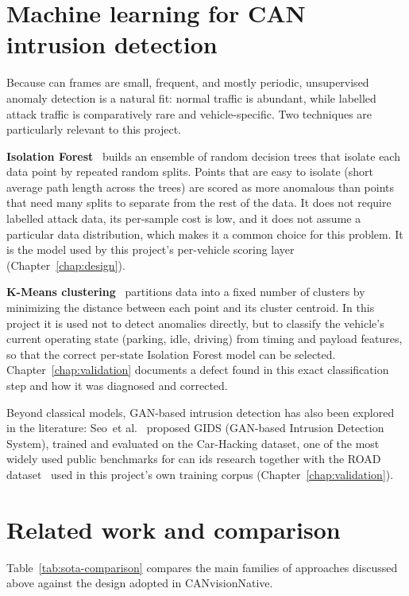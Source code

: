 \section{Machine learning for CAN intrusion detection}

Because \gls{can} frames are small, frequent, and mostly periodic, unsupervised anomaly detection is a natural fit: normal traffic is abundant, while labelled attack traffic is comparatively rare and vehicle-specific. Two techniques are particularly relevant to this project.

\textbf{Isolation Forest}~\cite{liu2008isolation} builds an ensemble of random decision trees that isolate each data point by repeated random splits. Points that are easy to isolate (short average path length across the trees) are scored as more anomalous than points that need many splits to separate from the rest of the data. It does not require labelled attack data, its per-sample cost is low, and it does not assume a particular data distribution, which makes it a common choice for this problem. It is the model used by this project's per-vehicle scoring layer (Chapter~\ref{chap:design}).

\textbf{K-Means clustering}~\cite{macqueen1967methods} partitions data into a fixed number of clusters by minimizing the distance between each point and its cluster centroid. In this project it is used not to detect anomalies directly, but to classify the vehicle's current operating state (parking, idle, driving) from timing and payload features, so that the correct per-state Isolation Forest model can be selected. Chapter~\ref{chap:validation} documents a defect found in this exact classification step and how it was diagnosed and corrected.

Beyond classical models, GAN-based intrusion detection has also been explored in the literature: Seo~et al.~\cite{seo2018gids} proposed GIDS (GAN-based Intrusion Detection System), trained and evaluated on the Car-Hacking dataset, one of the most widely used public benchmarks for \gls{can} \gls{ids} research together with the ROAD dataset~\cite{verma2020road} used in this project's own training corpus (Chapter~\ref{chap:validation}).

\section{Related work and comparison}

Table~\ref{tab:sota-comparison} compares the main families of approaches discussed above against the design adopted in CANvisionNative.

